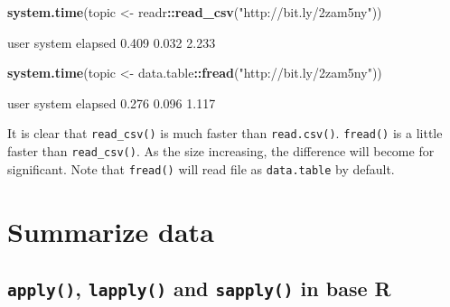 \documentclass[12pt,]{krantz}
\makeatletter
\newenvironment{Shaded}{\begin{snugshade}}{\end{snugshade}}
\newcommand{\KeywordTok}[1]{\textcolor[rgb]{0.27,0.27,0.27}{\textbf{#1}}}
\newcommand{\NormalTok}[1]{#1}
\newcommand{\OperatorTok}[1]{\textcolor[rgb]{0.43,0.43,0.43}{\textbf{#1}}}
\newcommand{\StringTok}[1]{\textcolor[rgb]{0.5,0.5,0.5}{#1}}
\newenvironment{kframe}{%
\medskip{}
\setlength{\fboxsep}{.8em}
 \def\at@end@of@kframe{}%
 \ifinner\ifhmode%
  \def\at@end@of@kframe{\end{minipage}}%
  \begin{minipage}{\columnwidth}%
 \fi\fi%
 \def\FrameCommand##1{\hskip\@totalleftmargin \hskip-\fboxsep
 \colorbox{shadecolor}{##1}\hskip-\fboxsep
     \hskip-\linewidth \hskip-\@totalleftmargin \hskip\columnwidth}%
 \MakeFramed {\advance\hsize-\width
   \@totalleftmargin\z@ \linewidth\hsize
   \@setminipage}}%
 {\par\unskip\endMakeFramed%
 \at@end@of@kframe}
\renewenvironment{Shaded}{\begin{kframe}}{\end{kframe}}
\makeatother
\begin{document}
\begin{Shaded}
\begin{Highlighting}[]
\KeywordTok{system.time}\NormalTok{(topic <-}\StringTok{ }\NormalTok{readr}\OperatorTok{::}\KeywordTok{read_csv}\NormalTok{(}\StringTok{"http://bit.ly/2zam5ny"}\NormalTok{))}
\end{Highlighting}
\end{Shaded}

\begin{Shaded}
\begin{Highlighting}[]
\NormalTok{   user  system elapsed }
\NormalTok{  0.409   0.032   2.233 }
\end{Highlighting}
\end{Shaded}

\begin{Shaded}
\begin{Highlighting}[]
\KeywordTok{system.time}\NormalTok{(topic <-}\StringTok{ }\NormalTok{data.table}\OperatorTok{::}\KeywordTok{fread}\NormalTok{(}\StringTok{"http://bit.ly/2zam5ny"}\NormalTok{))}
\end{Highlighting}
\end{Shaded}

\begin{Shaded}
\begin{Highlighting}[]
\NormalTok{   user  system elapsed }
\NormalTok{  0.276   0.096   1.117 }
\end{Highlighting}
\end{Shaded}

It is clear that \texttt{read\_csv()} is much faster than \texttt{read.csv()}. \texttt{fread()} is a little faster than \texttt{read\_csv()}. As the size increasing, the difference will become for significant. Note that \texttt{fread()} will read file as \texttt{data.table} by default.

\hypertarget{summarize-data}{%
\section{Summarize data}\label{summarize-data}}

\hypertarget{apply-lapply-and-sapply-in-base-r}{%
\subsection{\texorpdfstring{\texttt{apply()}, \texttt{lapply()} and \texttt{sapply()} in base R}{apply(), lapply() and sapply() in base R}}\label{apply-lapply-and-sapply-in-base-r}}
\end{document}
